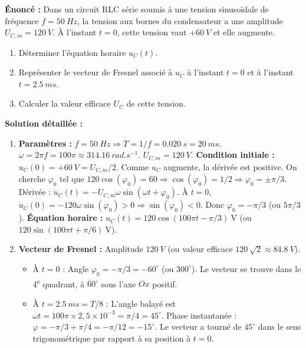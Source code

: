 \documentclass[11pt]{article}
\begin{document}
\begin{exoresolu}
\textbf{Énoncé :} Dans un circuit RLC série soumis à une tension sinusoïdale de fréquence $f = \SI{50}{Hz}$, la tension aux bornes du condensateur a une amplitude $U_{C,m} = \SI{120}{V}$. À l'instant $t=0$, cette tension vaut $+\SI{60}{V}$ et elle augmente. 
\begin{enumerate}
    \item Déterminer l'équation horaire $u_C(t)$.
    \item Représenter le vecteur de Fresnel associé à $u_C$ à l'instant $t=0$ et à l'instant $t = \SI{2,5}{ms}$.
    \item Calculer la valeur efficace $U_C$ de cette tension.
\end{enumerate}
\tcblower
\textbf{Solution détaillée :}
\begin{enumerate}
    \item \textbf{Paramètres :} $f = \SI{50}{Hz} \Rightarrow T = 1/f = \SI{0,020}{s} = \SI{20}{ms}$. $\omega = 2\pi f = 100\pi \approx \SI{314,16}{rad.s^{-1}}$. $U_{C,m} = \SI{120}{V}$.
    \textbf{Condition initiale :} $u_C(0) = +\SI{60}{V} = U_{C,m}/2$. Comme $u_C$ augmente, la dérivée est positive.
    On cherche $\varphi_0$ tel que $120 \cos(\varphi_0) = 60 \Rightarrow \cos(\varphi_0) = 1/2 \Rightarrow \varphi_0 = \pm \pi/3$.
    Dérivée : $\dot{u}_C(t) = -U_{C,m}\omega \sin(\omega t + \varphi_0)$. À $t=0$, $\dot{u}_C(0) = -120\omega \sin(\varphi_0) > 0 \Rightarrow \sin(\varphi_0) < 0$.
    Donc $\varphi_0 = -\pi/3$ (ou $5\pi/3$).
    \textbf{Équation horaire :} $\boxed{u_C(t) = 120 \cos(100\pi t - \pi/3)\ \text{V}}$ (ou $120 \sin(100\pi t + \pi/6)\ \text{V}$).
    \item \textbf{Vecteur de Fresnel :} Amplitude $\SI{120}{V}$ (ou valeur efficace $\SI{120}{\sqrt{2}} \approx \SI{84,8}{V}$).
    \begin{itemize}
        \item À $t=0$ : Angle $\varphi_0 = -\pi/3 = -60^\circ$ (ou $300^\circ$). Le vecteur se trouve dans le 4\textsuperscript{e} quadrant, à $60^\circ$ sous l'axe $Ox$ positif.
        \item À $t = \SI{2,5}{ms} = T/8$ : L'angle balayé est $\omega t = 100\pi \times 2,5\times 10^{-3} = \pi/4 = 45^\circ$.
        Phase instantanée : $\varphi = -\pi/3 + \pi/4 = -\pi/12 = -15^\circ$.
        Le vecteur a tourné de $45^\circ$ dans le sens trigonométrique par rapport à sa position à $t=0$.
    \end{itemize}

\end{enumerate}
\end{exoresolu}
\end{document}
